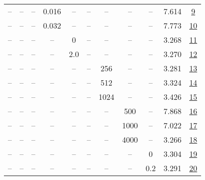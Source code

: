 \begin{table}[H]
\begin{tabular}{ccccccccccc}
-- & -- & -- & 0.016 & -- & -- & -- & -- & -- & 7.614 & \href{https://wandb.ai/stanford-mercury/optimizer-scaling/runs/sweep-130m-21B-minidb82b6lr0.016-wd0.1-minlr0-warmup2000-b10.9-b-765b78}{9} \\
-- & -- & -- & 0.032 & -- & -- & -- & -- & -- & 7.773 & \href{https://wandb.ai/stanford-mercury/optimizer-scaling/runs/sweep-130m-21B-minid9a283lr0.032-wd0.1-minlr0-warmup2000-b10.9-b-3d6c8c}{10} \\
-- & -- & -- & -- & 0 & -- & -- & -- & -- & 3.268 & \href{https://wandb.ai/stanford-mercury/optimizer-scaling/runs/sweep-130m-21B-mini9fbdb0lr0.008-wd0.1-minlr0-warmup2000-b10.9-b-d9603a}{11} \\
-- & -- & -- & -- & 2.0 & -- & -- & -- & -- & 3.270 & \href{https://wandb.ai/stanford-mercury/optimizer-scaling/runs/sweep-130m-21B-mini7a2e9flr0.008-wd0.1-minlr0-warmup2000-b10.9-b-74c0e1}{12} \\
-- & -- & -- & -- & -- & -- & 256 & -- & -- & 3.281 & \href{https://wandb.ai/stanford-mercury/optimizer-scaling/runs/sweep-130m-21B-mini8e0689lr0.008-wd0.1-minlr0-warmup2000-b10.9-b-f8ffc0}{13} \\
-- & -- & -- & -- & -- & -- & 512 & -- & -- & 3.324 & \href{https://wandb.ai/stanford-mercury/optimizer-scaling/runs/sweep-130m-21B-mini5a8324lr0.008-wd0.1-minlr0-warmup2000-b10.9-b-82522f}{14} \\
-- & -- & -- & -- & -- & -- & 1024 & -- & -- & 3.426 & \href{https://wandb.ai/stanford-mercury/optimizer-scaling/runs/sweep-130m-21B-mini845331lr0.008-wd0.1-minlr0-warmup2000-b10.9-b-05faa2}{15} \\
-- & -- & -- & -- & -- & -- & -- & 500 & -- & 7.868 & \href{https://wandb.ai/stanford-mercury/optimizer-scaling/runs/sweep-130m-21B-minid9bbbalr0.008-wd0.1-minlr0-warmup500-b10.9-b2-744cf6}{16} \\
-- & -- & -- & -- & -- & -- & -- & 1000 & -- & 7.022 & \href{https://wandb.ai/stanford-mercury/optimizer-scaling/runs/sweep-130m-21B-mini056a5flr0.008-wd0.1-minlr0-warmup1000-b10.9-b-d7cc88}{17} \\
-- & -- & -- & -- & -- & -- & -- & 4000 & -- & 3.266 & \href{https://wandb.ai/stanford-mercury/optimizer-scaling/runs/sweep-130m-21B-mini9445d9lr0.008-wd0.1-minlr0-warmup4000-b10.9-b-ae303f}{18} \\
-- & -- & -- & -- & -- & -- & -- & -- & 0 & 3.304 & \href{https://wandb.ai/stanford-mercury/optimizer-scaling/runs/sweep-130m-21B-mini2e27bblr0.008-wd0-minlr0-warmup2000-b10.9-b20-c75282}{19} \\
-- & -- & -- & -- & -- & -- & -- & -- & 0.2 & 3.291 & \href{https://wandb.ai/stanford-mercury/optimizer-scaling/runs/sweep-130m-21B-mini593df5lr0.008-wd0.2-minlr0-warmup2000-b10.9-b-27dd40}{20} \\
\bottomrule
\end{tabular}
\end{table}

